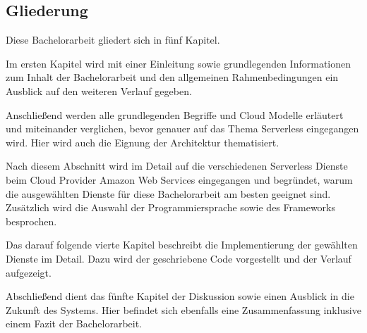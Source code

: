 \subsection{Gliederung}

Diese Bachelorarbeit gliedert sich in fünf Kapitel.

Im ersten Kapitel wird mit einer Einleitung sowie grundlegenden Informationen zum Inhalt der Bachelorarbeit und den allgemeinen Rahmenbedingungen ein Ausblick auf den weiteren Verlauf gegeben.

Anschließend werden alle grundlegenden Begriffe und Cloud Modelle erläutert und miteinander verglichen, bevor genauer auf das Thema Serverless eingegangen wird.
Hier wird auch die Eignung der Architektur thematisiert.

Nach diesem Abschnitt wird im Detail auf die verschiedenen Serverless Dienste beim Cloud Provider Amazon Web Services eingegangen und begründet, warum die ausgewählten Dienste für diese Bachelorarbeit am besten geeignet sind.
Zusätzlich wird die Auswahl der Programmiersprache sowie des Frameworks besprochen.

Das darauf folgende vierte Kapitel beschreibt die Implementierung der gewählten Dienste im Detail. Dazu wird der geschriebene Code vorgestellt und der Verlauf aufgezeigt.

Abschließend dient das fünfte Kapitel der Diskussion sowie einen Ausblick in die Zukunft des Systems.
Hier befindet sich ebenfalls eine Zusammenfassung inklusive einem Fazit der Bachelorarbeit.



